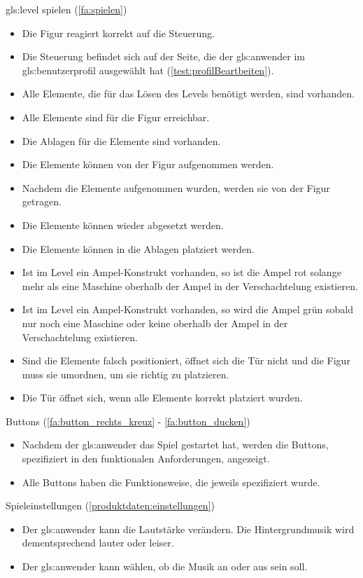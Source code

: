 \documentclass{scrartcl}
\begin{document}
\begin{telist}
	\item \gls{gls:level} spielen (\ref{fa:spielen})
	\begin{itemize}
		\item Die Figur reagiert korrekt auf die Steuerung.
		\item Die Steuerung befindet sich auf der Seite, die der \gls{gls:anwender} im \gls{gls:benutzerprofil} ausgewählt hat (\ref{test:profilBeartbeiten}).
		\item Alle Elemente, die für das Lösen des Levels benötigt werden, sind vorhanden.
		\item Alle Elemente sind für die Figur erreichbar.
		\item Die Ablagen für die Elemente sind vorhanden.
		\item Die Elemente können von der Figur aufgenommen werden.
		\item Nachdem die Elemente aufgenommen wurden, werden sie von der Figur getragen.
		\item Die Elemente können wieder abgesetzt werden.
		\item Die Elemente können in die Ablagen platziert werden.
		\item Ist im Level ein Ampel-Konstrukt vorhanden, so ist die Ampel rot solange mehr als eine Maschine oberhalb der Ampel in der Verschachtelung existieren.
		\item Ist im Level ein Ampel-Konstrukt vorhanden, so wird die Ampel grün sobald nur noch eine Maschine oder keine oberhalb der Ampel in der Verschachtelung existieren.
		\item Sind die Elemente falsch positioniert, öffnet sich die Tür nicht und die Figur muss sie umordnen, um sie richtig zu platzieren.
		\item Die Tür öffnet sich, wenn alle Elemente korrekt platziert wurden.
	\end{itemize}
	
	\item Buttons (\ref{fa:button_rechts_kreuz} - \ref{fa:button_ducken})
	\begin{itemize}
		\item Nachdem der \gls{gls:anwender} das Spiel gestartet hat, werden die Buttons, spezifiziert in den funktionalen Anforderungen, angezeigt.
		\item Alle Buttons haben die Funktionsweise, die jeweils spezifiziert wurde.
	\end{itemize}
	
	\item Spieleinstellungen (\ref{produktdaten:einstellungen})
	\begin{itemize}
		\item Der \gls{gls:anwender} kann die Lautstärke verändern. Die Hintergrundmusik wird dementsprechend lauter oder leiser.
		\item Der \gls{gls:anwender} kann wählen, ob die Musik an oder aus sein soll.
	\end{itemize}
	

\end{telist}
\end{document}
